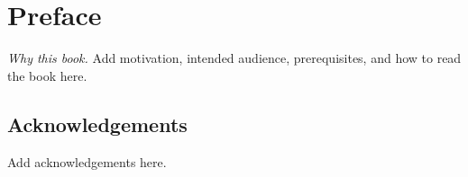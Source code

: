 \chapter*{Preface}

\emph{Why this book.} Add motivation, intended audience, prerequisites, and
how to read the book here.

\section*{Acknowledgements}
Add acknowledgements here.
